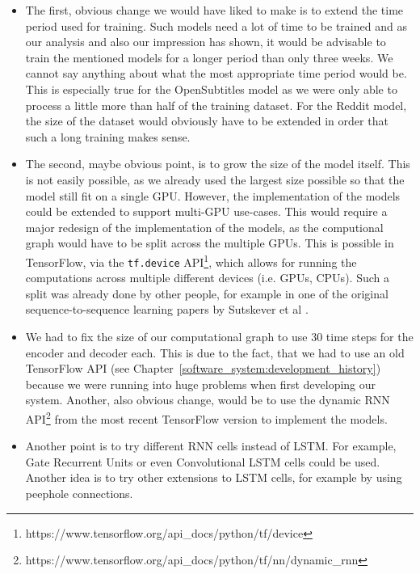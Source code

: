 \begin{itemize}
  \item The first, obvious change we would have liked to make is to extend the time period used for training. Such models need a lot of time to be trained and as our analysis and also our impression has shown, it would be advisable to train the mentioned models for a longer period than only three weeks. We cannot say anything about what the most appropriate time period would be. This is especially true for the OpenSubtitles model as we were only able to process a little more than half of the training dataset. For the Reddit model, the size of the dataset would obviously have to be extended in order that such a long training makes sense.
  
  \item The second, maybe obvious point, is to grow the size of the model itself. This is not easily possible, as we already used the largest size possible so that the model still fit on a single GPU. However, the implementation of the models could be extended to support multi-GPU use-cases. This would require a major redesign of the implementation of the models, as the computional graph would have to be split across the multiple GPUs. This is possible in TensorFlow, via the \texttt{tf.device} API\footnote{https://www.tensorflow.org/api\_docs/python/tf/device}, which allows for running the computations across multiple different devices (i.e. GPUs, CPUs). Such a split was already done by other people, for example in one of the original sequence-to-sequence learning papers by Sutskever et al \cite{Sutskever:2014}.

  \item We had to fix the size of our computational graph to use 30 time steps for the encoder and decoder each. This is due to the fact, that we had to use an old TensorFlow API (see Chapter~\ref{software_system:development_history}) because we were running into huge problems when first developing our system. Another, also obvious change, would be to use the dynamic RNN API\footnote{https://www.tensorflow.org/api\_docs/python/tf/nn/dynamic\_rnn} from the most recent TensorFlow version to implement the models.
  
  \item Another point is to try different RNN cells instead of LSTM. For example, Gate Recurrent Units \cite{Chung:2014} or even Convolutional LSTM \cite{Xingjian:2015} cells could be used. Another idea is to try other extensions to LSTM cells, for example by using peephole connections.


\end{itemize}
